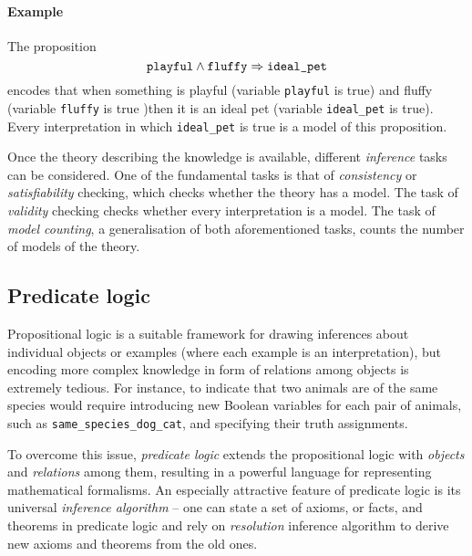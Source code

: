 \paragraph{Example} The proposition
$$\text{\texttt{playful}} \wedge \text{\texttt{fluffy}} \Rightarrow \text{\texttt{ideal\_pet}} $$
encodes that when something is playful (variable \texttt{playful} is true) and fluffy (variable \texttt{fluffy} is true )then it is an ideal pet (variable \texttt{ideal\_pet} is true).
Every interpretation in which \texttt{ideal\_pet} is true is a model of this proposition.




Once the theory describing the knowledge is available, different \textit{inference} tasks can be considered.
One of the fundamental tasks is that of \textit{consistency} or \textit{satisfiability} checking, which checks whether the theory has a model.
The task of \textit{validity} checking checks whether every interpretation is a model.
The task of \textit{model counting}, a generalisation of both aforementioned tasks, counts the number of models of the theory.









\subsection{Predicate logic}


Propositional logic is a suitable framework for drawing inferences about individual objects or examples (where each example is an interpretation), but encoding more complex knowledge in form of relations among objects is extremely tedious.
For instance, to indicate that two animals are of the same species would require introducing new Boolean variables for each pair of animals, such as \texttt{same\_species\_dog\_cat}, and specifying their truth assignments.



To overcome this issue, \textit{predicate logic} extends the propositional logic with \textit{objects} and \textit{relations} among them, resulting in a powerful language for representing mathematical formalisms.
An especially attractive feature of predicate logic is its universal \textit{inference algorithm} -- one can state a set of axioms, or facts, and theorems in predicate logic and rely on \textit{resolution} \cite{Robinson:1965:Resolution} inference algorithm to derive new axioms and theorems from the old ones.



